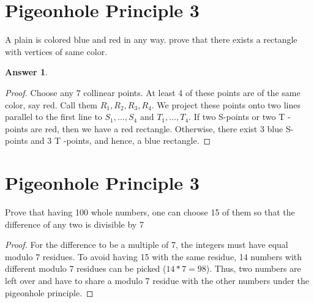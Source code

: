 \documentclass{article}
\renewcommand{\(}{\left(}
\renewcommand{\)}{\right)}
\theoremstyle{plain}
\theoremstyle{plain}
\theoremstyle{definition}
\newtheorem*{answer}{Answer}
\begin{document}
\section{Pigeonhole Principle 3}
A plain is colored blue  and red in any way. prove that there exists a rectangle with vertices of same color.

\begin{shaded}
\begin{answer}
\begin{proof}
Choose any 7 collinear points. At least 4 of these points are of the same color, say
red. Call them $ R_1, R_2, R_3, R_4 $. We project these points onto two lines parallel to the
first line to $S_1, \dots , S_4 $ and $T_1, \dots , T_4$. If two S-points or two T -points are red, then
we have a red rectangle. Otherwise, there exist 3 blue S-points and 3 T -points, and
hence, a blue rectangle.
\end{proof}
\end{answer}
\end{shaded}

\section{Pigeonhole Principle 3}
Prove that having 100 whole numbers, one can choose 15 of them so that the difference of any two is divisible by 7
\begin{shaded}
\begin{proof}
For the difference to be a multiple of 7, the integers must have equal modulo 7 residues. To avoid having 15 with the same residue, 14 numbers with different modulo 7 residues can be picked ($14 * 7 = 98$). Thus, two numbers are left over and have to share a modulo 7 residue with the other numbers under the pigeonhole principle.
\end{proof}
\end{shaded}
\end{document}
